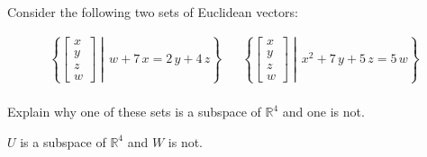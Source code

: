 
\begin{exerciseStatement}


Consider the following two sets of Euclidean vectors: 


\begin{align*}  \left\{ \left[\begin{array}{c}
x \\
y \\
z \\
w
\end{array}\right] \middle|\,w + 7 \, x = 2 \, y + 4 \, z\right\}  & &   \left\{ \left[\begin{array}{c}
x \\
y \\
z \\
w
\end{array}\right] \middle|\,x^{2} + 7 \, y + 5 \, z = 5 \, w\right\}  \\ \end{align*}
            

 Explain why one of these sets is a subspace of \(\mathbb{R}^ 4 \) and one is not. 


\end{exerciseStatement}
    
\begin{exerciseAnswer} 


\(U\) is a subspace of \(\mathbb{R}^ 4 \) and \(W\) is not.


\end{exerciseAnswer}
    
